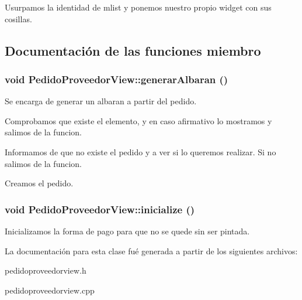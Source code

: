 Usurpamos la identidad de mlist y ponemos nuestro propio widget con sus cosillas. 

\subsection{Documentaci\'{o}n de las funciones miembro}
\subsubsection{\setlength{\rightskip}{0pt plus 5cm}void Pedido\-Proveedor\-View::generar\-Albaran ()}\label{classPedidoProveedorView_a2}


Se encarga de generar un albaran a partir del pedido. 

Comprobamos que existe el elemento, y en caso afirmativo lo mostramos y salimos de la funcion.

Informamos de que no existe el pedido y a ver si lo queremos realizar. Si no salimos de la funcion.

Creamos el pedido. 
\subsubsection{\setlength{\rightskip}{0pt plus 5cm}void Pedido\-Proveedor\-View::inicialize ()}\label{classPedidoProveedorView_a4}


Inicializamos la forma de pago para que no se quede sin ser pintada. 

La documentaci\'{o}n para esta clase fu\'{e} generada a partir de los siguientes archivos:\begin{CompactItemize}
\item 
pedidoproveedorview.h\item 
pedidoproveedorview.cpp\end{CompactItemize}
